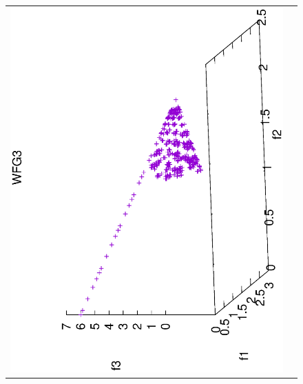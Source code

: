 \begin{figure}[H]
\begin{tabular}{cc}
  \includegraphics[scale=0.3, angle=-90,origin=c]{Figures_Chapter7/Results_Chapter4/Summary_Representative/VSD-MOEA/WFG3.eps} &

\end{tabular}
\end{figure}
